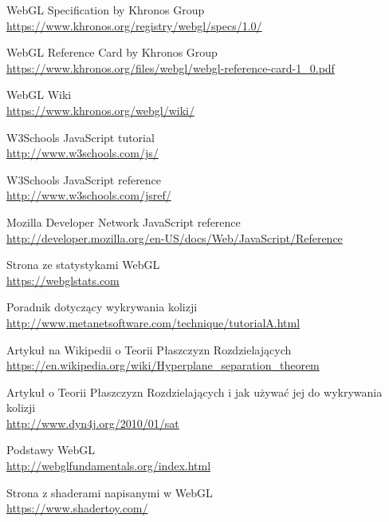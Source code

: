 \pagestyle{bibliographyStyle}
\thispagestyle{chapterBeginStyle}
\begin{thebibliography}{9}
	
	WebGL Specification by Khronos Group\\
	\url{https://www.khronos.org/registry/webgl/specs/1.0/}
	
	WebGL Reference Card by Khronos Group\\
	\url{https://www.khronos.org/files/webgl/webgl-reference-card-1_0.pdf}
	
	WebGL Wiki\\
	\url{https://www.khronos.org/webgl/wiki/}
	
	W3Schools JavaScript tutorial\\
	\url{http://www.w3schools.com/js/}
	
	W3Schools JavaScript reference\\
	\url{http://www.w3schools.com/jsref/}
	
	Mozilla Developer Network JavaScript reference\\
	\url{http://developer.mozilla.org/en-US/docs/Web/JavaScript/Reference}
	
	Strona ze statystykami WebGL\\
	\url{https://webglstats.com}
	
	Poradnik dotyczący wykrywania kolizji\\
	\url{http://www.metanetsoftware.com/technique/tutorialA.html}
	
	Artykuł na Wikipedii o Teorii Płaszczyzn Rozdzielających\\
	\url{https://en.wikipedia.org/wiki/Hyperplane_separation_theorem}
	
	Artykuł o Teorii Płaszczyzn Rozdzielających i jak używać jej do wykrywania kolizji\\
	\url{http://www.dyn4j.org/2010/01/sat}
	
	Podstawy WebGL\\
	\url{http://webglfundamentals.org/index.html}
	
	
	Strona z shaderami napisanymi w WebGL\\
	\url{https://www.shadertoy.com/}
	
\end{thebibliography}
\cleardoublepage